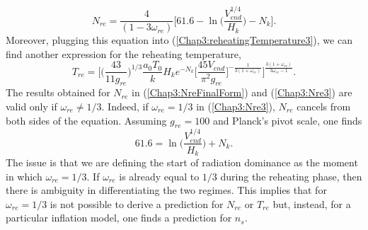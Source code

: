 \documentclass[11pt,a4paper,twoside]{book}
\begin{document}
\begin{equation}
	\label{Chap3:NreFinalForm}
	N_{re}=\frac{4}{(1-3\omega_{re})}\Bigg[61.6 - \ln \Bigg( \frac{V_{end}^{1/4}}{H_{k}}\Bigg) - N_{k}     \Bigg].
\end{equation}
Moreover, plugging this equation into (\ref{Chap3:reheatingTemperature3}), we can find another expression for the reheating temperature,
\begin{equation}	
T_{re} = \Bigg[\Bigg(\frac{43}{11g_{re}}\Bigg)^{1/3}\frac{a_{0}T_{0}}{k}H_{k}e^{-N_{k}}\Big[\dfrac{45 V_{end}}{\pi^{2}g_{re}}\Big]^{-\frac{1}{3(1+\omega_{re})}}\Bigg]^{\frac{3(1+\omega_{re})}{3\omega_{re}-1}}.	
\end{equation}
The results obtained for $ N_{re} $ in (\ref{Chap3:NreFinalForm}) and (\ref{Chap3:Nre3}) are valid only if $\omega_{re} \ne 1/3$. Indeed, if $\omega_{re}=1/3$ in  (\ref{Chap3:Nre3}), $ N_{re} $ cancels from both sides of the equation. Assuming $ g_{re} = 100 $ and Planck's pivot scale, one finds \cite{Chap3:Cook}
\begin{equation}
	61.6 = \ln \Bigg( \frac{V_{end}^{1/4}}{H_{k}}\Bigg) + N_{k}.
\end{equation}
The issue is that we are defining the start of radiation dominance as the moment in which $\omega_{re}=1/3$. If $\omega_{re}$ is already equal to $ 1/3 $ during the reheating phase, then there is ambiguity in differentiating the two regimes. This implies that for $\omega_{re}=1/3$ is not possible to derive a prediction for $ N_{re} $ or $ T_{re} $ but, instead, for a particular inflation model, one finds a prediction for $ n_{s} $.
\end{document}
